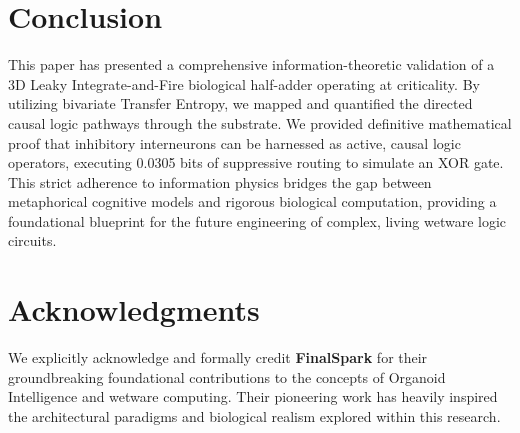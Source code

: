 \documentclass[12pt, a4paper]{article}
\begin{document}
\section{Conclusion}

This paper has presented a comprehensive information-theoretic validation of a 3D Leaky Integrate-and-Fire biological half-adder operating at criticality. By utilizing bivariate Transfer Entropy, we mapped and quantified the directed causal logic pathways through the substrate. We provided definitive mathematical proof that inhibitory interneurons can be harnessed as active, causal logic operators, executing 0.0305 bits of suppressive routing to simulate an XOR gate. This strict adherence to information physics bridges the gap between metaphorical cognitive models and rigorous biological computation, providing a foundational blueprint for the future engineering of complex, living wetware logic circuits.

\section*{Acknowledgments}

We explicitly acknowledge and formally credit \textbf{FinalSpark} for their groundbreaking foundational contributions to the concepts of Organoid Intelligence and wetware computing. Their pioneering work has heavily inspired the architectural paradigms and biological realism explored within this research.
\end{document}
